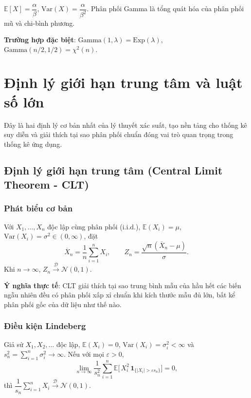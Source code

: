 \begin{tinhchat}
$\mathbb{E}[X]=\dfrac{\alpha}{\beta}$, $\text{Var}(X)=\dfrac{\alpha}{\beta^2}$. Phân phối Gamma là tổng quát hóa của phân phối mũ và chi-bình phương.

\textbf{Trường hợp đặc biệt}: $\text{Gamma}(1,\lambda)=\text{Exp}(\lambda)$, $\text{Gamma}(n/2,1/2)=\chi^2(n)$.
\end{tinhchat}

\section{Định lý giới hạn trung tâm và luật số lớn}

Đây là hai định lý cơ bản nhất của lý thuyết xác suất, tạo nền tảng cho thống kê suy diễn và giải thích tại sao phân phối chuẩn đóng vai trò quan trọng trong thống kê ứng dụng.

\subsection{Định lý giới hạn trung tâm (Central Limit Theorem - CLT)}

\subsubsection*{Phát biểu cơ bản}
\begin{dl}
Với $X_1,\ldots,X_n$ độc lập cùng phân phối (i.i.d.), $\mathbb{E}(X_i)=\mu$, $\text{Var}(X_i)=\sigma^2\in(0,\infty)$, đặt
\[
\overline{X}_n=\frac{1}{n}\sum_{i=1}^n X_i,\qquad Z_n=\frac{\sqrt{n}(\overline{X}_n-\mu)}{\sigma}.
\]
Khi $n\to\infty$, $Z_n\xrightarrow{\mathcal{D}}\mathcal{N}(0,1)$.
\end{dl}

\begin{tinhchat}
\textbf{Ý nghĩa thực tế}: CLT giải thích tại sao trung bình mẫu của hầu hết các biến ngẫu nhiên đều có phân phối xấp xỉ chuẩn khi kích thước mẫu đủ lớn, bất kể phân phối gốc của dữ liệu như thế nào.
\end{tinhchat}

\subsubsection*{Điều kiện Lindeberg}
\begin{dl}
Giả sử $X_1,X_2,\ldots$ độc lập, $\mathbb{E}(X_i)=0$, $\text{Var}(X_i)=\sigma_i^2<\infty$ và $s_n^2=\sum_{i=1}^n\sigma_i^2\to\infty$. Nếu với mọi $\varepsilon>0$,
\[
\lim_{n\to\infty}\frac{1}{s_n^2}\sum_{i=1}^n \mathbb{E}\Big[\,X_i^2\,\mathbf{1}_{\{|X_i|>\varepsilon s_n\}}\Big]=0,
\]
thì $\dfrac{1}{s_n}\sum_{i=1}^n X_i\xrightarrow{\mathcal{D}}\mathcal{N}(0,1)$.
\end{dl}

